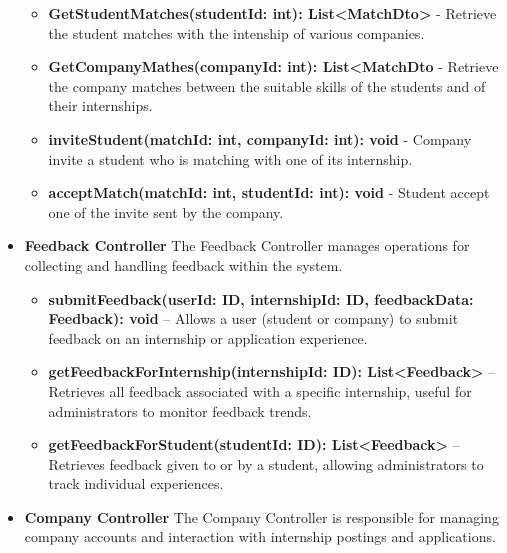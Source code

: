 \begin{itemize}
\begin{itemize}
    \item \textbf{GetStudentMatches(studentId: int): List<MatchDto>} - Retrieve the student matches with the intenship of various companies.
    \item \textbf{GetCompanyMathes(companyId: int): List<MatchDto} - Retrieve the company matches between the suitable skills of the students and of their internships.
    \item \textbf{inviteStudent(matchId: int, companyId: int): void} - Company invite a student who is matching with one of its internship.
    \item \textbf{acceptMatch(matchId: int, studentId: int): void} - Student accept one of the invite sent by the company.

\end{itemize}


\item \textbf{Feedback Controller}
The Feedback Controller manages operations for collecting and handling feedback within the system.

\begin{itemize}
    \item \textbf{submitFeedback(userId: ID, internshipId: ID, feedbackData: Feedback): void} – Allows a user (student or company) to submit feedback on an internship or application experience.
    \item \textbf{getFeedbackForInternship(internshipId: ID): List<Feedback>} – Retrieves all feedback associated with a specific internship, useful for administrators to monitor feedback trends.
    \item \textbf{getFeedbackForStudent(studentId: ID): List<Feedback>} – Retrieves feedback given to or by a student, allowing administrators to track individual experiences.
\end{itemize}

\item \textbf{Company Controller}
The Company Controller is responsible for managing company accounts and interaction with internship postings and applications.


\end{itemize}

